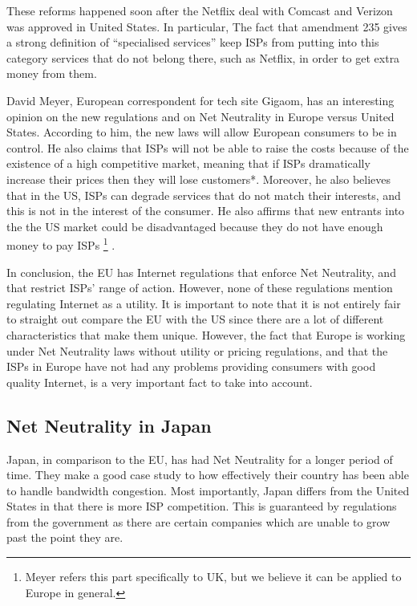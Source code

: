 \documentclass{sigcomm-alternate}
\begin{document}
These reforms happened soon after the Netflix deal with Comcast and Verizon was approved in United States. In particular, The fact that amendment 235 gives a strong definition of “specialised services”  keep ISPs from putting into this category services that do not belong there, such as Netflix, in order to get extra money from them\cite{gigaom}.

David Meyer, European correspondent for tech site Gigaom, has an interesting opinion on the new regulations and on Net Neutrality in Europe versus United States. According to him, the new laws will allow European consumers to be in control. He also claims that ISPs will not be able to raise the costs because of the existence of a high competitive market, meaning that if ISPs dramatically increase their prices then they will lose customers*. Moreover, he also believes that in the US, ISPs can degrade services that do not match their interests, and this is not in the interest of the consumer. He also affirms that new entrants into the the US market could be disadvantaged because they do not have enough money to pay ISPs \cite{inthenews} \footnote{Meyer refers this part specifically to UK, but we believe it can be applied to Europe in general.} .

In conclusion, the EU has Internet regulations that enforce Net Neutrality, and that restrict ISPs’ range of action. However, none of these regulations mention regulating Internet as a utility. It is important to note that it is not entirely fair to straight out compare the EU with the US since there are a lot of different characteristics that make them unique. However, the fact that Europe is working under Net Neutrality laws without utility or pricing regulations, and that the ISPs in Europe have not had any problems providing consumers with good quality Internet, is a very important fact to take into account.



\subsection{Net Neutrality in Japan}

Japan, in comparison to the EU, has had Net Neutrality for a longer period of time.  They make a good case study to how effectively their country has been able to handle bandwidth congestion.  Most importantly, Japan differs from the United States in that there is more ISP competition.  This is guaranteed by regulations from the government as there are certain companies which are unable to grow past the point they are.
\end{document}
